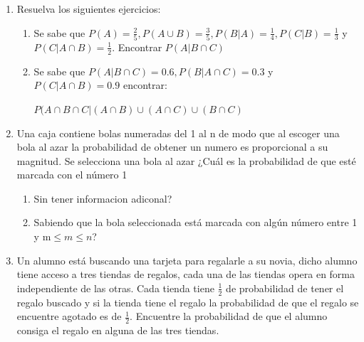 \documentclass[12pt,a4paper]{report}
\begin{document}
\begin{enumerate}
  \item{
 Resuelva los siguientes ejercicios:\\
 \begin{enumerate}[label=\alph*) ]
 \item{Se sabe que $P(A)= \frac{2}{5},P(A\cup B)=\frac{3}{5},P(B|A)=\frac{1}{4},P(C|B)=\frac{1}{3}$ y $P(C|A\cap B)=\frac{1}{2}$. Encontrar $P(A|B\cap C)$}\\
 \item{Se sabe que $P(A|B\cap C)=0.6, P(B|A\cap C)=0.3$ y $P(C|A\cap B)=0.9$ encontrar: \\
 \begin{center}
 $P(A\cap B\cap C| (A\cap B) \cup (A\cap C) \cup (B\cap C)$
 \end{center} }
 \end{enumerate}
  }


  \item{
 Una caja contiene bolas numeradas del 1 al n de modo que al escoger una bola al azar la probabilidad de obtener un numero es proporcional a su magnitud. Se selecciona una bola al azar ¿Cuál es la probabilidad de que esté marcada con el número 1\\
 \begin{enumerate}[label= \alph*) ]
 \item{Sin tener informacion adiconal?}\\
 \item{Sabiendo que la bola seleccionada está marcada con algún número entre 1 y m$\leq m \leq n$?}
 \end{enumerate}
  }

  \item{
Un alumno está buscando una tarjeta para regalarle a su novia, dicho alumno tiene acceso a tres tiendas de regalos, cada una de las tiendas opera en forma independiente de las otras. Cada tienda tiene $\frac{1}{2}$ de probabilidad de tener el regalo buscado y si la tienda tiene el regalo la probabilidad de que el regalo se encuentre agotado es de $\frac{1}{2}$. Encuentre la probabilidad de que el alumno consiga el regalo en alguna de las tres tiendas.
  }






\end{enumerate}
\end{document}

